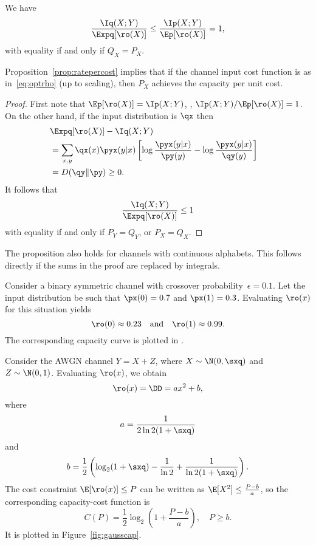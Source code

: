 \begin{proposition}
  \label{prop:ratepercost}
  We have
  \begin{equation}
    \label{eq:ratepercost}
    \frac{\Iq(X;Y)}{\Expq[\ro(X)]} \le \frac{\Ip(X;Y)}{\Ep[\ro(X)]} = 1,
  \end{equation}
  with equality if and only if $Q_X = P_X$.
\end{proposition}

Proposition~\ref{prop:ratepercost} implies that if the channel input cost
function is as in~\eqref{eq:optrho} (up to scaling), then $P_X$ achieves the
capacity per unit cost.

\begin{proof}
  First note that $\Ep[\ro(X)] = \Ip(X;Y)$, \ie, $\Ip(X;Y) / \Ep[\ro(X)] = 1$.
  On the other hand, if the input distribution is $\qx$ then
  \begin{align*}
    \lefteqn{\Expq[\ro(X)] - \Iq(X;Y)} \\
    &= \sum_{x,y} \qx(x) \pyx(y|x) \left[ \log \frac{\pyx(y|x)}{\py(y)} -
    \log \frac{\pyx(y|x)}{\qy(y)} \right] \\
    &= D(\qy \| \py) \ge 0.
  \end{align*}
  It follows that
  \[ \frac{\Iq(X;Y)}{\Expq [\ro(X)]} \le 1
  \]
  with equality if and only if $P_Y = Q_Y$, or $P_X = Q_X$.
\end{proof}

\begin{remark}
  \label{rem:continuouscuc}
  The proposition also holds for channels with continuous alphabets. This
  follows directly if the sums in the proof are replaced by integrals.
\end{remark}

\begin{example}[BSC]
  \label{ex:bsccap}
  Consider a binary symmetric channel with crossover
  probability~$\epsilon=0.1$. Let the input distribution be such that $\px(0) =
  0.7$ and $\px(1) = 0.3$. Evaluating $\ro(x)$ for this situation yields
  \begin{equation*}
    \ro(0) \approx 0.23 \quad\text{and} \quad
    \ro(1) \approx 0.99.
  \end{equation*}
  The corresponding capacity curve is plotted in .
\end{example}

\begin{example}[Gaussian]
  \label{ex:gausscap}
  Consider the AWGN channel $Y=X+Z$, where $X \sim \N(0,\sxq)$ and $Z \sim
  \N(0,1)$. Evaluating $\ro(x)$, we obtain
  \[ \ro(x) = \DD = ax^2 + b, \]
  where
  \[ a = \frac{1}{2 \ln2 (1+\sxq)} \]
  and
  \[ b = \frac12 \left( \log_2(1+\sxq) - \frac{1}{\ln2} +
  \frac{1}{\ln 2 (1+\sxq)} \right). \]
  The cost constraint $\E[\ro(x)] \le P$ can be written as $\E[X^2] \le
  \frac{P-b}{a}$, so the corresponding capacity-cost function is
  \[ C(P) = \frac12 \log_2 (1 + \frac{P-b}{a}), \quad P \ge b. \]
  It is plotted in Figure~\ref{fig:gausscap}.
\end{example}

